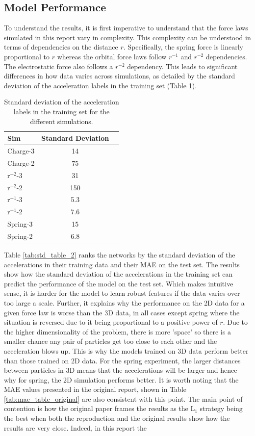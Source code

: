 \documentclass[11pt]{article}
\begin{document}
\subsection{Model Performance}
To understand the results, it is first imperative to understand that the force laws simulated in this report vary in complexity. This complexity can be understood in terms of dependencies on the distance \( r \). Specifically, the spring force is linearly proportional to \( r \) whereas the orbital force laws follow \( r^{-1} \) and \( r^{-2} \) dependencies. The electrostatic force also follows a \( r^{-2} \) dependency. This leads to significant differences in how data varies across simulations, as detailed by the standard deviation of the acceleration labels in the training set (Table \ref{tab:std_table}).
\begin{table}[H]
    \centering
    \begin{tabular}{lcc}
    \hline
    Sim & Standard Deviation \\
    \hline
    Charge-3 & 14 \\
    Charge-2 & 75 \\
    r$^{-2}$-3 & 31 \\
    r$^{-2}$-2 & 150 \\
    r$^{-1}$-3 & 5.3 \\
    r$^{-1}$-2 & 7.6 \\
    Spring-3 & 15 \\
    Spring-2 & 6.8 \\
    \hline
    \end{tabular}
    \caption{Standard deviation of the acceleration labels in the training set for the different simulations.}
    \label{tab:std_table}
\end{table}
Table \ref{tab:std_table_2} ranks the networks by the standard deviation of the accelerations in their training data and their MAE on the test set. The results show how the standard deviation of the accelerations in the training set can predict the performance of the model on the test set. Which makes intuitive sense, it is harder for the model to learn robust features if the data varies over too large a scale. Further, it explains why the performance on the 2D data for a given force law is worse than the 3D data, in all cases except spring where the situation is reversed due to it being proportional to a positive power of $r$. Due to the higher dimensionality of the problem, there is more 'space' so there is a smaller chance any pair of particles get too close to each other and the acceleration blows up. This is why the models trained on 3D data perform better than those trained on 2D data. For the spring experiment, the larger distances between particles in 3D means that the accelerations will be larger and hence why for spring, the 2D simulation performs better. It is worth noting that the MAE values presented in the original report, shown in Table \ref{tab:mae_table_original} are also consistent with this point. The main point of contention is how the original paper frames the results as the L$_1$ strategy being the best when both the reproduction and the original results show how the results are very close. Indeed, in this report the 
\end{document}
